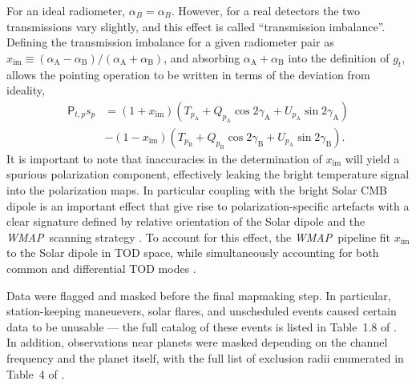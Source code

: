 \documentclass[twocolumn]{../../common/aa}
\def\WMAP{\emph{WMAP}}
\newcommand{\A}[0]{\mathrm{A}}
\newcommand{\B}[0]{\mathrm{B}}
\begin{document}
For an ideal radiometer, $\alpha_B = \alpha_B$. However, for a real detectors the two transmissions vary slightly, and this effect is called ``transmission imbalance''. Defining the transmission imbalance for a given radiometer pair as $x_\mathrm{im}\equiv(\alpha_\A-\alpha_\B)/(\alpha_\A+\alpha_\B)$, and absorbing $\alpha_\A+\alpha_\B$ into the definition of $g_t$, allows the pointing operation to be written in terms of the deviation from ideality,
\begin{align}
	\mathsf P_{t,p}s_p
	&=(1+x_\mathrm{im})(T_{p_\A}+Q_{p_\A}\cos2\gamma_\A + U_{p_\A}\sin2\gamma_\A)
	\nonumber
	\\
	&
	-(1-x_\mathrm{im})(T_{p_\B}+Q_{p_\B}\cos2\gamma_\B + U_{p_\A}\sin2\gamma_\B).
\end{align}
It is important to note that inaccuracies in the determination of $x_\mathrm{im}$ will yield a spurious polarization component, effectively leaking the bright temperature signal into the polarization maps. In particular coupling with the bright Solar CMB dipole is an important effect that give rise to polarization-specific artefacts with a clear signature defined by relative orientation of the Solar dipole and the \WMAP\ scanning strategy \citep{jarosik2007}. To account for this effect, the \WMAP\ pipeline fit $x_\mathrm{im}$ to the Solar dipole in TOD space, while simultaneously accounting for both common and differential TOD modes \citep{jarosik2003a,jarosik2007}.

Data were flagged and masked before the final mapmaking step. In particular, station-keeping maneuevers, solar flares, and unscheduled events caused certain data to be unusable --- the full catalog of these events is listed in Table~1.8 of \citet{wmapexsupp}. In addition, observations near planets were masked depending on the channel frequency and the planet itself, with the full list of exclusion radii enumerated in Table~4 of \citet{bennett2012}.
\end{document}
